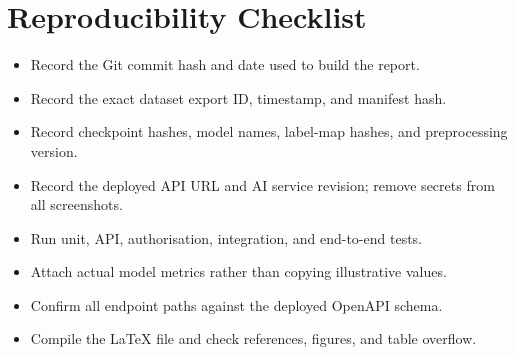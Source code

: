 \documentclass[12pt,a4paper,oneside,openany]{report}
\begin{document}
\chapter{Reproducibility Checklist}
\begin{itemize}
\item Record the Git commit hash and date used to build the report.
\item Record the exact dataset export ID, timestamp, and manifest hash.
\item Record checkpoint hashes, model names, label-map hashes, and preprocessing version.
\item Record the deployed API URL and AI service revision; remove secrets from all screenshots.
\item Run unit, API, authorisation, integration, and end-to-end tests.
\item Attach actual model metrics rather than copying illustrative values.
\item Confirm all endpoint paths against the deployed OpenAPI schema.
\item Compile the LaTeX file and check references, figures, and table overflow.
\end{itemize}
\end{document}
